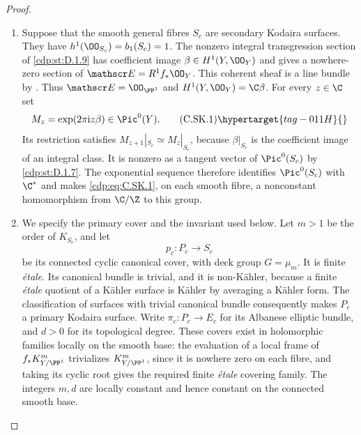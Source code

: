 \begin{proof}

\begin{enumerate}[label={$\langle1\rangle$\arabic*.},leftmargin=*]
\item Suppose that the smooth general fibres $S_c$ are secondary
Kodaira surfaces. They have $h^1(\OO_{S_c})=b_1(S_c)=1$.
The nonzero integral transgression section of \ref{cdp:st:D.1.9} has
coefficient image $\beta\in H^1(Y,\OO_Y)$ and gives a
nowhere-zero section of $\mathscr E=R^1f_*\OO_Y$.
This coherent sheaf is a line bundle by \cite[Theorem~2.2, pp.~4--5]{Viaclovsky2026Combs}. Thus
$\mathscr E=\OO_{\PP^1}$ and
$H^1(Y,\OO_Y)=\C\beta$. For every $z\in\C$ set
\[
 M_z=\exp(2\pi\mathrm i z\beta)\in\Pic^0(Y).
\tag{C.SK.1}\hypertarget{tag-011H}{}\label{cdp:eq:C.SK.1}
\]
Its restriction satisfies $M_{z+1}|_{S_c}\simeq M_z|_{S_c}$,
because $\beta|_{S_c}$ is the coefficient image of an
integral class. It is nonzero as a tangent vector of
$\Pic^0(S_c)$ by \ref{cdp:st:D.1.7}. The exponential sequence therefore
identifies $\Pic^0(S_c)$ with $\C^*$ and makes \eqref{cdp:eq:C.SK.1}, on
each smooth fibre, a nonconstant homomorphism from
$\C/\Z$ to this group.

\item We specify the primary cover and the invariant used below.
Let $m>1$ be the order of $K_{S_c}$, and let
\[
 p_c:P_c\longrightarrow S_c
\]
be its connected cyclic canonical cover, with deck group
$G=\mu_m$. It is finite \emph{\'etale}. Its canonical bundle
is trivial, and it is non-K\"ahler, because a finite
\emph{\'etale} quotient of a K\"ahler surface is K\"ahler
by averaging a K\"ahler form. The classification of
surfaces with trivial canonical bundle consequently makes
$P_c$ a primary Kodaira surface. Write
$\pi_c:P_c\to E_c$ for its Albanese elliptic bundle, and
$d>0$ for its topological degree. These covers exist in
holomorphic families locally on the smooth base: the
evaluation of a local frame of $f_*K_{Y/\PP^1}^{m}$
trivializes $K_{Y/\PP^1}^{m}$, since it is nowhere zero on
each fibre, and taking its cyclic root gives the required
finite \emph{\'etale} covering family. The integers $m,d$
are locally constant and hence constant on the connected
smooth base.


\end{enumerate}
\end{proof}
